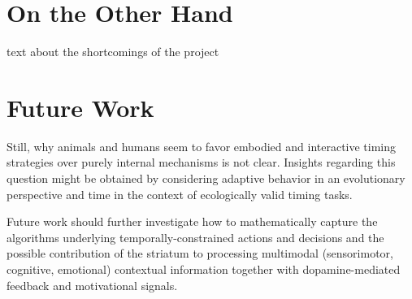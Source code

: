 \section{On the Other Hand}
text about the shortcomings of the project

\section{Future Work}

Still, why animals and humans seem to favor embodied and interactive timing strategies over purely internal mechanisms is not clear.
Insights regarding this question might be obtained by considering adaptive behavior in an evolutionary perspective\cite{Cisek2019} and time in the context of ecologically valid timing tasks\cite{vanRijn2018}.


Future work should further investigate how to mathematically capture the algorithms underlying temporally-constrained actions and decisions and the possible contribution of the striatum to processing multimodal (sensorimotor, cognitive, emotional) contextual information together with dopamine-mediated feedback and motivational signals.


